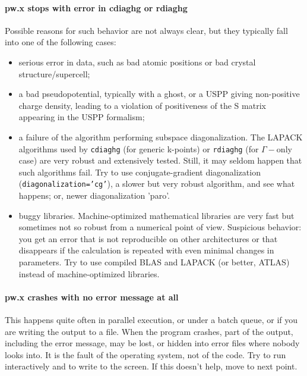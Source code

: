 \documentclass[12pt,a4paper]{article}
\begin{document}
\paragraph{pw.x stops with error in cdiaghg or rdiaghg}
Possible reasons for such behavior are not always clear, but they
typically fall into one of the following cases:
\begin{itemize}
\item serious error in data, such as bad atomic positions or bad
  crystal structure/supercell; 
\item a bad pseudopotential, typically with a ghost, or a USPP giving
  non-positive charge density, leading to a violation of positiveness
  of the S matrix appearing in the USPP formalism;  
\item a failure of the algorithm performing subspace
  diagonalization. The LAPACK algorithms used by \texttt{cdiaghg}
  (for generic k-points) or \texttt{rdiaghg} (for $\Gamma-$only case)
  are
  very robust and extensively tested. Still, it may seldom happen that
  such algorithms fail. Try to use conjugate-gradient diagonalization
  (\texttt{diagonalization='cg'}), a slower but very robust algorithm,
  and see what happens; or, newer diagonalization 'paro'.
\item buggy libraries. Machine-optimized mathematical libraries are
  very fast but sometimes not so robust from a numerical point of
  view.  Suspicious behavior: you get an error that is not
  reproducible on other architectures or that disappears if the
  calculation is repeated with even minimal changes in
  parameters. Try to use compiled BLAS and LAPACK (or better, ATLAS)
  instead of machine-optimized libraries. 
\end{itemize}

\paragraph{pw.x crashes with no error message at all}
This happens quite often in parallel execution, or under a batch
queue, or if you are writing the output to a file. When the program
crashes, part of the output, including the error message, may be lost,
or hidden into error files where nobody looks into. It is the fault of
the operating system, not of the code. Try to run interactively 
and to write to the screen. If this doesn't help, move to next point.
\end{document}
